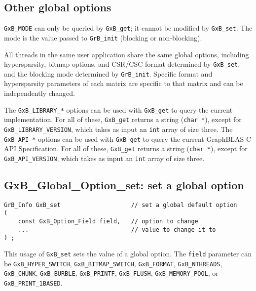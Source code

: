 \documentclass[12pt]{article}
\begin{document}
{%
\subsection{Other global options}

\verb'GxB_MODE' can only be
queried by \verb'GxB_get'; it cannot be modified by \verb'GxB_set'.  The mode
is the value passed to \verb'GrB_init' (blocking or non-blocking).

All threads in the same user application share the same global options,
including hypersparsity, bitmap options, and CSR/CSC format determined by
\verb'GxB_set', and the blocking mode determined by \verb'GrB_init'.
Specific format and hypersparsity parameters of each matrix are specific to
that matrix and can be independently changed.

The \verb'GxB_LIBRARY_*' options can be used with \verb'GxB_get' to query the
current implementation.  For all of these, \verb'GxB_get' returns a string
(\verb'char *'), except for \verb'GxB_LIBRARY_VERSION', which takes as input an
\verb'int' array of size three.  The \verb'GxB_API_*' options can be used with
\verb'GxB_get' to query the current GraphBLAS C API Specification.  For all of
these, \verb'GxB_get' returns a string (\verb'char *'), except for
\verb'GxB_API_VERSION', which takes as input an \verb'int' array of size three.  

\subsection{{\sf GxB\_Global\_Option\_set:} set a global option}

\begin{mdframed}[userdefinedwidth=6in]
{\footnotesize
\begin{verbatim}
GrB_Info GxB_set                    // set a global default option
(
    const GxB_Option_Field field,   // option to change
    ...                             // value to change it to
) ;
\end{verbatim} } \end{mdframed}

This usage of \verb'GxB_set' sets the value of a global option.
The \verb'field' parameter can be
\verb'GxB_HYPER_SWITCH',
\verb'GxB_BITMAP_SWITCH',
\verb'GxB_FORMAT',
\verb'GxB_NTHREADS',
\verb'GxB_CHUNK',
\verb'GxB_BURBLE',
\verb'GxB_PRINTF',
\verb'GxB_FLUSH',
\verb'GxB_MEMORY_POOL',
or
\verb'GxB_PRINT_1BASED'.

}
\end{document}
